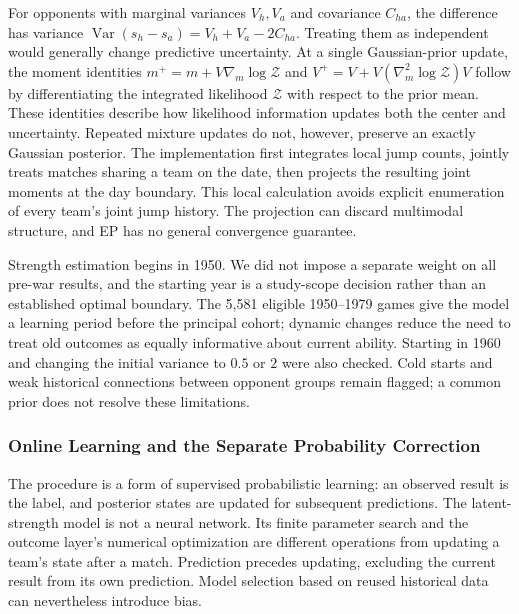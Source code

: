 For opponents with marginal variances $V_h,V_a$ and covariance $C_{ha}$, the difference has variance $\operatorname{Var}(s_h-s_a)=V_h+V_a-2C_{ha}$. Treating them as independent would generally change predictive uncertainty. At a single Gaussian-prior update, the moment identities $m^+=m+V\nabla_m\log\mathcal Z$ and $V^+=V+V(\nabla_m^2\log\mathcal Z)V$ follow by differentiating the integrated likelihood $\mathcal Z$ with respect to the prior mean. These identities describe how likelihood information updates both the center and uncertainty. Repeated mixture updates do not, however, preserve an exactly Gaussian posterior. The implementation first integrates local jump counts, jointly treats matches sharing a team on the date, then projects the resulting joint moments at the day boundary. This local calculation avoids explicit enumeration of every team's joint jump history. The projection can discard multimodal structure, and EP has no general convergence guarantee.

Strength estimation begins in 1950. We did not impose a separate weight on all pre-war results, and the starting year is a study-scope decision rather than an established optimal boundary. The 5,581 eligible 1950--1979 games give the model a learning period before the principal cohort; dynamic changes reduce the need to treat old outcomes as equally informative about current ability. Starting in 1960 and changing the initial variance to $0.5$ or $2$ were also checked. Cold starts and weak historical connections between opponent groups remain flagged; a common prior does not resolve these limitations.

\subsubsection{Online Learning and the Separate Probability Correction}

The procedure is a form of supervised probabilistic learning: an observed result is the label, and posterior states are updated for subsequent predictions. The latent-strength model is not a neural network. Its finite parameter search and the outcome layer's numerical optimization are different operations from updating a team's state after a match. Prediction precedes updating, excluding the current result from its own prediction. Model selection based on reused historical data can nevertheless introduce bias.

